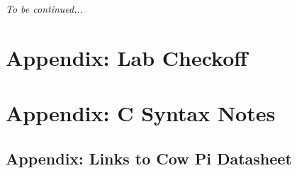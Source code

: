 \documentclass[12pt]{article}
\begin{document}
    \textit{To be continued...}

    \appendix

    \section{Appendix: Lab Checkoff}                                                


    \section{Appendix: C Syntax Notes}                                              

    \newpage

    \begin{landscape}
        \section{Appendix: Links to Cow Pi Datasheet}                               
    \end{landscape}
\end{document}
